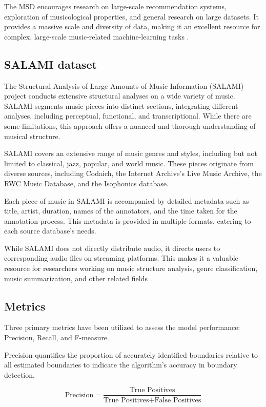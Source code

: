 The MSD encourages research on large-scale recommendation systems, exploration of musicological properties, and general research on large datasets. It provides a massive scale and diversity of data, making it an excellent resource for complex, large-scale music-related machine-learning tasks \cite{MSD}.

\subsection{SALAMI dataset}

The Structural Analysis of Large Amounts of Music Information (SALAMI) project conducts extensive structural analyses on a wide variety of music. SALAMI segments music pieces into distinct sections, integrating different analyses, including perceptual, functional, and transcriptional. While there are some limitations, this approach offers a nuanced and thorough understanding of musical structure.

SALAMI covers an extensive range of music genres and styles, including but not limited to classical, jazz, popular, and world music. These pieces originate from diverse sources, including Codaich, the Internet Archive's Live Music Archive, the RWC Music Database, and the Isophonics database.

Each piece of music in SALAMI is accompanied by detailed metadata such as title, artist, duration, names of the annotators, and the time taken for the annotation process. This metadata is provided in multiple formats, catering to each source database's needs.

While SALAMI does not directly distribute audio, it directs users to corresponding audio files on streaming platforms. This makes it a valuable resource for researchers working on music structure analysis, genre classification, music summarization, and other related fields \cite{Smith2011DESIGNANNOTATIONS}.

\subsection{Metrics}

Three primary metrics have been utilized to assess the model performance: Precision, Recall, and F-measure. 

Precision quantifies the proportion of accurately identified boundaries relative to all estimated boundaries to indicate the algorithm's accuracy in boundary detection.

\begin{equation}
\text{Precision} = \frac{\text{True Positives}}{\text{True Positives} + \text{False Positives}}
\end{equation}

